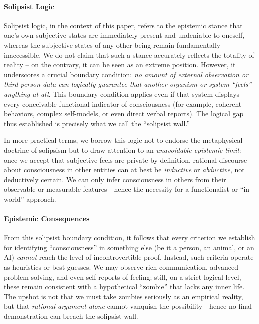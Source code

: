 \documentclass[12pt]{article}
\begin{document}
\paragraph{Solipsist Logic}

Solipsist logic, in the context of this paper, refers to the epistemic stance that one's own subjective states are immediately present and undeniable to oneself, whereas the subjective states of any other being remain fundamentally inaccessible. We do not claim that such a stance accurately reflects the totality of reality -- on the contrary, it can be seen as an extreme position. However, it underscores a crucial boundary condition: \textit{no amount of external observation or third-person data can logically guarantee that another organism or system ``feels'' anything at all}. This boundary condition applies even if that system displays every conceivable functional indicator of consciousness (for example, coherent behaviors, complex self-models, or even direct verbal reports). The logical gap thus established is precisely what we call the ``solipsist wall.''

In more practical terms, we borrow this logic not to endorse the metaphysical doctrine of solipsism but to draw attention to an \textit{unavoidable epistemic limit}: once we accept that subjective feels are private by definition, rational discourse about consciousness in other entities can at best be \textit{inductive} or \textit{abductive}, not deductively certain. We can only infer consciousness in others from their observable or measurable features---hence the necessity for a functionalist or ``in-world'' approach.

\paragraph{Epistemic Consequences}

From this solipsist boundary condition, it follows that every criterion we establish for identifying ``consciousness'' in something else (be it a person, an animal, or an AI) \textit{cannot} reach the level of incontrovertible proof. Instead, such criteria operate as heuristics or best guesses. We may observe rich communication, advanced problem-solving, and even self-reports of feeling; still, on a strict logical level, these remain consistent with a hypothetical ``zombie'' that lacks any inner life. The upshot is not that we must take zombies seriously as an empirical reality, but that \textit{rational argument alone} cannot vanquish the possibility---hence no final demonstration can breach the solipsist wall.
\end{document}
